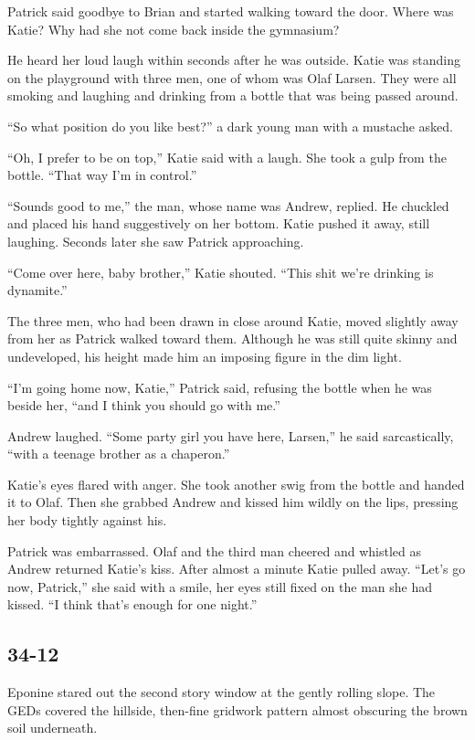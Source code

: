 \documentclass[]{article}
\begin{document}
{Patrick said goodbye to Brian and started walking toward the door. Where was Katie? Why had she not come back inside the gymnasium?

He heard her loud laugh within seconds after he was outside. Katie was standing on the playground with three men, one of whom was Olaf Larsen. They were all smoking and laughing and drinking from a bottle that was being passed around.

“So what position do you like best?” a dark young man with a mustache asked.

“Oh, I prefer to be on top,” Katie said with a laugh. She took a gulp from the bottle. “That way I’m in control.”

“Sounds good to me,” the man, whose name was Andrew, replied. He chuckled and placed his hand suggestively on her bottom. Katie pushed it away, still laughing. Seconds later she saw Patrick approaching.

“Come over here, baby brother,” Katie shouted. “This shit we’re drinking is dynamite.”

The three men, who had been drawn in close around Katie, moved slightly away from her as Patrick walked toward them. Although he was still quite skinny and undeveloped, his height made him an imposing figure in the dim light.

“I’m going home now, Katie,” Patrick said, refusing the bottle when he was beside her, “and I think you should go with me.”

Andrew laughed. “Some party girl you have here, Larsen,” he said sarcastically, “with a teenage brother as a chaperon.”

Katie’s eyes flared with anger. She took another swig from the bottle and handed it to Olaf. Then she grabbed Andrew and kissed him wildly on the lips, pressing her body tightly against his.

Patrick was embarrassed. Olaf and the third man cheered and whistled as Andrew returned Katie’s kiss. After almost a minute Katie pulled away. “Let’s go now, Patrick,” she said with a smile, her eyes still fixed on the man she had kissed. “I think that’s enough for one night.”


\subsection{34-12}

Eponine stared out the second story window at the gently rolling slope. The GEDs covered the hillside, then-fine gridwork pattern almost obscuring the brown soil underneath.

}
\end{document}
